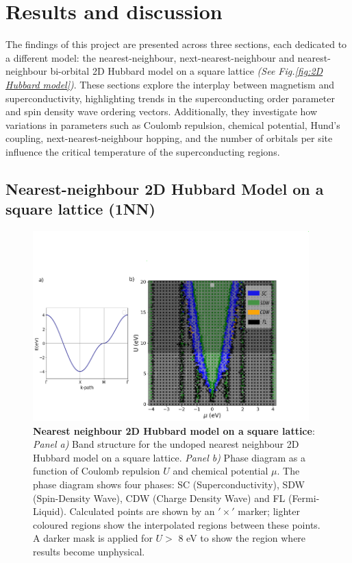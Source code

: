 \documentclass[11pt]{article}
\begin{document}
\section{Results and discussion}

The findings of this project are presented across three sections, each dedicated to 
a different model: the nearest-neighbour, next-nearest-neighbour and nearest-neighbour
bi-orbital 2D Hubbard model on a square lattice \textit{(See Fig.\ref{fig:2D Hubbard model})}. 
These sections explore the interplay between magnetism and superconductivity, 
highlighting trends in the superconducting order parameter and spin density wave
ordering vectors. Additionally, they investigate how variations in parameters such as 
Coulomb repulsion, chemical potential, Hund's coupling, next-nearest-neighbour hopping, and the number of orbitals per site 
influence the critical temperature of the superconducting regions.

\subsection{Nearest-neighbour 2D Hubbard Model on a square lattice (1NN)}
\label{subsec:1NNModel}

\begin{figure}[htbp]  %
    \centering
    \includegraphics[width=0.95\textwidth]{1NNphased.png}  %
    \caption{\textbf{Nearest neighbour 2D Hubbard model on a square lattice}: 
    \textit{Panel a)} Band structure for the undoped nearest neighbour 2D Hubbard model on a square lattice.
    \textit{Panel b)} Phase diagram as a function of Coulomb repulsion $U$ and chemical 
    potential $\mu$. The phase diagram shows four phases: SC (Superconductivity), SDW (Spin-Density Wave), CDW (Charge Density Wave) and FL (Fermi-Liquid).
    Calculated points are shown by an $'\times '$ marker; lighter coloured regions show the interpolated regions between these points. A darker mask is applied for $U > $ 8 eV to show the 
    region where results become unphysical.}

    \label{fig:1NNpd}
\end{figure} 
\end{document}
